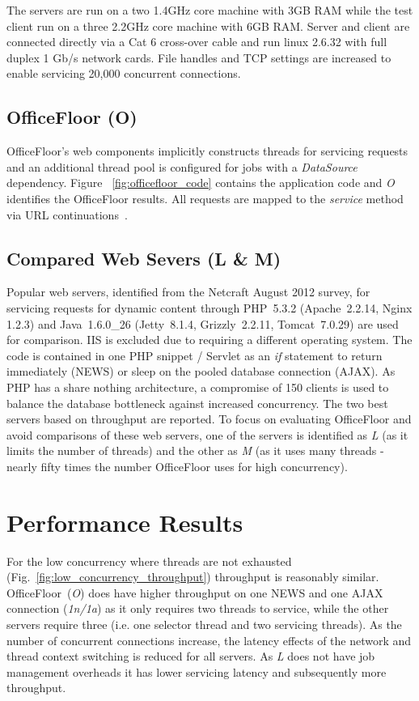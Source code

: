 \documentclass[conference]{ieee/IEEEtran}
\begin{document}
The servers are run on a two 1.4GHz core machine with 3GB RAM while the test
client run on a three 2.2GHz core machine with 6GB RAM.  Server and client are
connected directly via a Cat 6 cross-over cable and run linux 2.6.32 with full
duplex 1 Gb/s network cards.  File handles and TCP settings are increased to
enable servicing 20,000 concurrent connections.

\subsection{OfficeFloor (O)}
OfficeFloor's web components implicitly constructs threads for servicing
requests and an additional thread pool is configured for jobs with a
\textit{DataSource} dependency.  Figure ~\ref{fig:officefloor_code} contains the
application code and \textit{O} identifies the OfficeFloor results.  All
requests are mapped to the \textit{service} method via URL
continuations~\cite{url-continuation}.


\subsection{Compared Web Severs (L \& M)}
Popular web servers, identified from the Netcraft August 2012 survey, for
servicing requests for dynamic content through PHP~5.3.2 (Apache~2.2.14, Nginx
1.2.3) and Java~1.6.0\_26 (Jetty~8.1.4, Grizzly~2.2.11, Tomcat~7.0.29) are used
for comparison.  IIS is excluded due to requiring a different operating system.
The code is contained in one PHP snippet / Servlet as an \textit{if} statement
to return immediately (NEWS) or sleep on the pooled database connection (AJAX).
As PHP has a share nothing architecture, a compromise of 150 clients is used to
balance the database bottleneck against increased concurrency.  The two best
servers based on throughput are reported.  To focus on evaluating OfficeFloor
and avoid comparisons of these web servers, one of the servers is identified as
\textit{L} (as it limits the number of threads) and the other as \textit{M} (as
it uses many threads - nearly fifty times the number OfficeFloor uses for high
concurrency).



\section{Performance Results}
For the low concurrency where threads are not exhausted
(Fig.~\ref{fig:low_concurrency_throughput}) throughput is reasonably similar.
OfficeFloor~(\textit{O}) does have higher throughput on one NEWS and one AJAX
connection (\textit{1n/1a}) as it only requires two threads to service, while
the other servers require three (i.e. one selector thread and two servicing
threads).  As the number of concurrent connections increase, the latency effects
of the network and thread context switching is reduced for all servers.  As
\textit{L} does not have job management overheads it has lower servicing latency
and subsequently more throughput.
\end{document}
